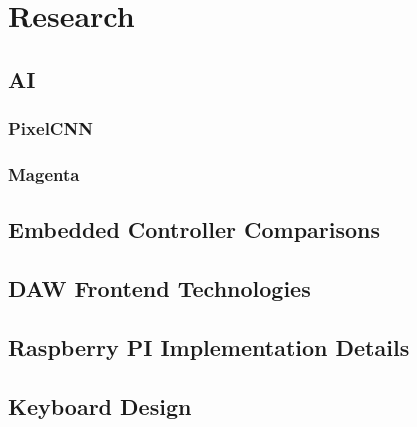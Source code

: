 \section{Research}

\subsection{AI}

\blindtext

\subsubsection{PixelCNN}

\blindtext

\subsubsection{Magenta}

\blindtext

\subsection{Embedded Controller Comparisons}

\blindtext

\subsection{DAW Frontend Technologies}

\blindtext

\subsection{Raspberry PI Implementation Details}

\blindtext

\subsection{Keyboard Design}

\blindtext
